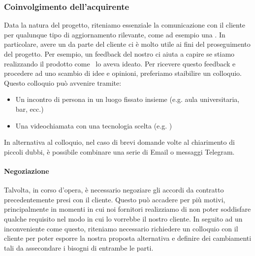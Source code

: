 		\subsubsection{Coinvolgimento dell'acquirente} \label{ConivolgimentoAcquirente}
		Data la natura del progetto, riteniamo essenziale la comunicazione con il cliente per qualunque tipo di aggiornamento rilevante, come ad esempio una .
		In particolare, avere un  da parte del cliente ci è molto utile ai fini del proseguimento del progetto.
		Per esempio, un feedback del nostro  ci aiuta a capire se stiamo realizzando il prodotto come \II\ lo aveva ideato.
		Per ricevere questo feedback e procedere ad uno scambio di idee e opinioni, preferiamo staibilire un colloquio.
		Questo colloquio può avvenire tramite:
		\begin{itemize}
			\item Un incontro di persona in un luogo fissato insieme (e.g. aula universitaria, bar, ecc.)
			\item Una videochiamata con una tecnologia scelta (e.g. )
		\end{itemize}
		In alternativa al colloquio, nel caso di brevi domande volte al chiarimento di piccoli dubbi, è possibile combinare una serie di Email o messaggi Telegram.

		\paragraph{Negoziazione} \label{Negoziazione}
		Talvolta, in corso d'opera, è necessario negoziare gli accordi da contratto precedentemente presi con il cliente.
		Questo può accadere per più motivi, principalmente in momenti in cui noi fornitori realizziamo di non poter soddisfare qualche requisito nel modo in cui lo vorrebbe il nostro cliente.
		In seguito ad un inconveniente come questo, riteniamo necessario richiedere un colloquio con il cliente per poter esporre la nostra proposta alternativa e definire dei cambiamenti tali da assecondare i bisogni di entrambe le parti.

